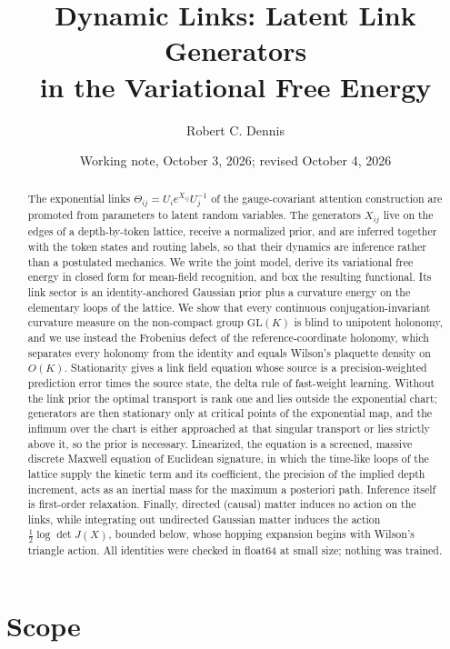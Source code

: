 \documentclass[11pt]{article}
\title{Dynamic Links: Latent Link Generators\\in the Variational Free Energy}
\author{Robert C. Dennis}
\date{Working note, October 3, 2026; revised October 4, 2026}
\theoremstyle{definition}
\theoremstyle{remark}
\providecommand{\GL}{\mathrm{GL}}
\begin{document}
\maketitle

\begin{abstract}
The exponential links $\Theta_{ij}=U_ie^{X_{ij}}U_j^{-1}$ of the gauge-covariant attention construction are promoted from parameters to latent random variables. The generators $X_{ij}$ live on the edges of a depth-by-token lattice, receive a normalized prior, and are inferred together with the token states and routing labels, so that their dynamics are inference rather than a postulated mechanics. We write the joint model, derive its variational free energy in closed form for mean-field recognition, and box the resulting functional. Its link sector is an identity-anchored Gaussian prior plus a curvature energy on the elementary loops of the lattice. We show that every continuous conjugation-invariant curvature measure on the non-compact group $\GL(K)$ is blind to unipotent holonomy, and we use instead the Frobenius defect of the reference-coordinate holonomy, which separates every holonomy from the identity and equals Wilson's plaquette density on $O(K)$. Stationarity gives a link field equation whose source is a precision-weighted prediction error times the source state, the delta rule of fast-weight learning. Without the link prior the optimal transport is rank one and lies outside the exponential chart; generators are then stationary only at critical points of the exponential map, and the infimum over the chart is either approached at that singular transport or lies strictly above it, so the prior is necessary. Linearized, the equation is a screened, massive discrete Maxwell equation of Euclidean signature, in which the time-like loops of the lattice supply the kinetic term and its coefficient, the precision of the implied depth increment, acts as an inertial mass for the maximum a posteriori path. Inference itself is first-order relaxation. Finally, directed (causal) matter induces no action on the links, while integrating out undirected Gaussian matter induces the action $\tfrac12\log\det J(X)$, bounded below, whose hopping expansion begins with Wilson's triangle action. All identities were checked in float64 at small size; nothing was trained.
\end{abstract}

\section{Scope}
\label{dl:sec:scope}
\end{document}
